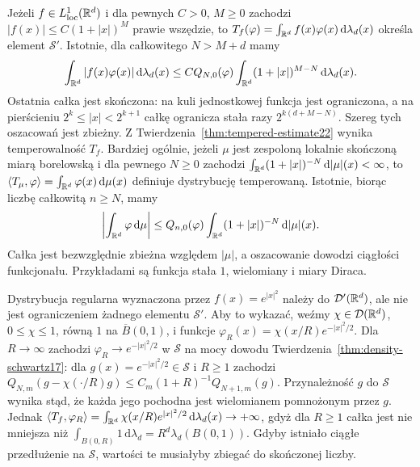 \begin{przyklad}
\label{ex:tempered-regular22}
Jeżeli $f\in L^1_{\mathrm{loc}}(\mathbb R^d)$ i
dla pewnych $C>0$, $M\ge0$ zachodzi
$|f(x)|\le C(1+|x|)^M$ prawie wszędzie,
to $T_f(\varphi)=\int_{\mathbb R^d}f(x)\varphi(x)\,\mathrm d\lambda_d(x)$
określa element $\mathcal S'$. Istotnie, dla całkowitego $N>M+d$ mamy
\[
 \int_{\mathbb R^d}|f(x)\varphi(x)|\,\mathrm d\lambda_d(x)
 \le C Q_{N,0}(\varphi)
 \int_{\mathbb R^d}(1+|x|)^{M-N}\,\mathrm d\lambda_d(x).
\]
Ostatnia całka jest skończona: na kuli jednostkowej
funkcja jest ograniczona, a na pierścieniu
$2^k\le |x|<2^{k+1}$ całkę ogranicza stała razy
$2^{k(d+M-N)}$. Szereg tych oszacowań jest zbieżny.
Z Twierdzenia~\ref{thm:tempered-estimate22} wynika
temperowalność $T_f$.
Bardziej ogólnie, jeżeli $\mu$ jest zespoloną lokalnie skończoną
miarą borelowską i dla pewnego $N\ge0$ zachodzi
$\int_{\mathbb R^d}(1+|x|)^{-N}\,\mathrm d|\mu|(x)<\infty$,
to $\langle T_\mu,\varphi\rangle=
\int_{\mathbb R^d}\varphi(x)\,\mathrm d\mu(x)$
definiuje dystrybucję temperowaną. Istotnie, biorąc
liczbę całkowitą $n\ge N$, mamy
\[
 \left|\int_{\mathbb R^d}\varphi\,\mathrm d\mu\right|
 \le Q_{n,0}(\varphi)
 \int_{\mathbb R^d}(1+|x|)^{-N}\,\mathrm d|\mu|(x).
\]
Całka jest bezwzględnie zbieżna względem $|\mu|$,
a oszacowanie dowodzi ciągłości funkcjonału.
Przykładami są funkcja stała $1$, wielomiany i miary Diraca.
\end{przyklad}

\begin{przyklad}
\label{ex:non-tempered22}
Dystrybucja regularna wyznaczona przez
$f(x)=e^{|x|^2}$ należy do $\mathcal D'(\mathbb R^d)$,
ale nie jest ograniczeniem żadnego elementu $\mathcal S'$.
Aby to wykazać, weźmy $\chi\in\mathcal D(\mathbb R^d)$,
$0\le\chi\le1$, równą $1$ na $\overline B(0,1)$,
i funkcje $\varphi_R(x)=\chi(x/R)e^{-|x|^2/2}$.
Dla $R\to\infty$ zachodzi
$\varphi_R\to e^{-|x|^2/2}$ w $\mathcal S$
na mocy dowodu Twierdzenia~\ref{thm:density-schwartz17}:
dla $g(x)=e^{-|x|^2/2}\in\mathcal S$ i $R\ge1$ zachodzi
$Q_{N,m}(g-\chi(\cdot/R)g)\le
C_m(1+R)^{-1}Q_{N+1,m}(g)$.
Przynależność $g$ do $\mathcal S$ wynika stąd, że
każda jego pochodna jest wielomianem pomnożonym przez $g$.
Jednak
$\langle T_f,\varphi_R\rangle
=\int_{\mathbb R^d}\chi(x/R)e^{|x|^2/2}\,\mathrm d\lambda_d(x)
\to+\infty$,
gdyż dla $R\ge1$ całka jest nie mniejsza niż
$\int_{B(0,R)}1\,\mathrm d\lambda_d=
R^d\lambda_d(B(0,1))$.
Gdyby istniało ciągłe przedłużenie na $\mathcal S$,
wartości te musiałyby zbiegać do skończonej liczby.
\end{przyklad}

